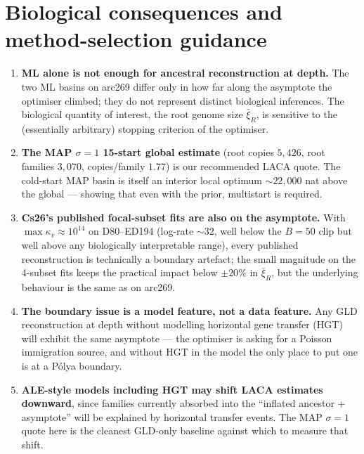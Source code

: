\documentclass[11pt]{article}
\newcommand{\troot}{R}
\newcommand{\rate}{\kappa}             %
\theoremstyle{definition}
\begin{document}
\section{Biological consequences and method-selection guidance}
\label{sec:biology}

\begin{enumerate}[leftmargin=*]
\item \textbf{ML alone is not enough for ancestral reconstruction at
depth.} The two ML basins on arc269 differ only in how far along
the asymptote the optimiser climbed; they do not represent distinct
biological inferences. The biological quantity of interest, the
root genome size $\bar\xi_\troot$, is sensitive to the (essentially
arbitrary) stopping criterion of the optimiser.
\item \textbf{The MAP $\sigma=1$ 15-start global estimate} (root
copies $5{,}426$, root families $3{,}070$, copies/family $1.77$) is
our recommended LACA quote. The cold-start MAP basin is itself an
interior local optimum $\sim 22{,}000$ nat above the global ---
showing that even with the prior, multistart is required.
\item \textbf{Cs26's published focal-subset fits are also on the
asymptote.} With $\max\rate_v\approx 10^{14}$ on D80--ED194
(log-rate $\sim 32$, well below the $B=50$ clip but well above any
biologically interpretable range), every published reconstruction
is technically a boundary artefact; the small magnitude on the
4-subset fits keeps the practical impact below $\pm 20\%$ in
$\bar\xi_\troot$, but the underlying behaviour is the same as on
arc269.
\item \textbf{The boundary issue is a model feature, not a data
feature.} Any GLD reconstruction at depth without modelling
horizontal gene transfer (HGT) will exhibit the same asymptote ---
the optimiser is asking for a Poisson immigration source, and
without HGT in the model the only place to put one is at a Pólya
boundary.
\item \textbf{ALE-style models including HGT may shift LACA
estimates downward}, since families currently absorbed into the
``inflated ancestor + asymptote'' will be explained by horizontal
transfer events. The MAP $\sigma=1$ quote here is the cleanest
GLD-only baseline against which to measure that shift.
\end{enumerate}

\appendix
\end{document}
